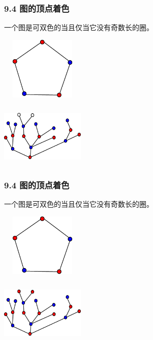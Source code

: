 \documentclass{beamer}
\begin{document}
\begin{CJK}{UTF8}{gbsn}
\begin{frame}
\begin{minipage}{0.45\linewidth}
  \end{minipage}
\end{frame}
\begin{frame}
  \frametitle{9.4 图的顶点着色}
  \begin{theorem9.4.1}
    一个图是可双色的当且仅当它没有奇数长的圈。
  \end{theorem9.4.1}
\vspace{1cm}
  \begin{minipage}{0.45\linewidth}
\includegraphics[width=4cm,height=3cm]{pentagon5}    
  \end{minipage}
  \begin{minipage}{0.45\linewidth}
    \includegraphics[width=4cm,height=3cm]{color24}
  \end{minipage}
\end{frame}
\begin{frame}
  \frametitle{9.4 图的顶点着色}
  \begin{theorem9.4.1}
    一个图是可双色的当且仅当它没有奇数长的圈。
  \end{theorem9.4.1}
\vspace{1cm}
  \begin{minipage}{0.45\linewidth}
\includegraphics[width=4cm,height=3cm]{pentagon5}    
  \end{minipage}
  \begin{minipage}{0.45\linewidth}
    \includegraphics[width=4cm,height=3cm]{color25}
  \end{minipage}
\end{frame}


\end{CJK}
\end{document}
